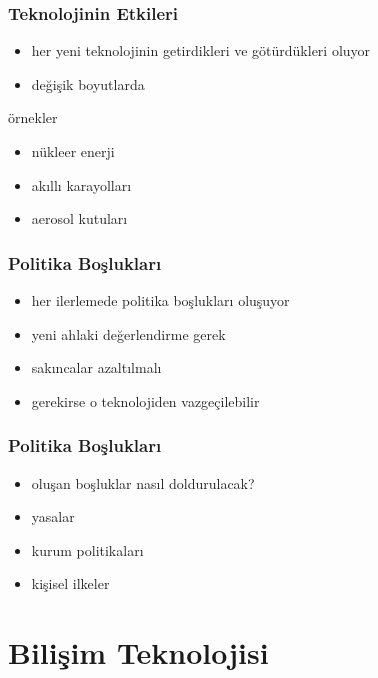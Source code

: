 \documentclass[dvipsnames]{beamer}
\theoremstyle{plain}
\begin{document}
\begin{frame}
  \frametitle{Teknolojinin Etkileri}

  \begin{itemize}
    \item her yeni teknolojinin getirdikleri ve götürdükleri oluyor
    \item değişik boyutlarda
  \end{itemize}

  \begin{exampleblock}{örnekler}
    \begin{itemize}
      \item nükleer enerji
      \item akıllı karayolları
      \item aerosol kutuları
    \end{itemize}
  \end{exampleblock}
\end{frame}

\begin{frame}
  \frametitle{Politika Boşlukları}

  \begin{itemize}
    \item her ilerlemede politika boşlukları oluşuyor

    \bigskip
    \item yeni ahlaki değerlendirme gerek
    \item sakıncalar azaltılmalı
    \item gerekirse o teknolojiden vazgeçilebilir
  \end{itemize}
\end{frame}

\begin{frame}
  \frametitle{Politika Boşlukları}

  \begin{itemize}
    \item oluşan boşluklar nasıl doldurulacak?

    \bigskip
    \item yasalar
    \item kurum politikaları
    \item kişisel ilkeler
  \end{itemize}
\end{frame}

\section{Bilişim Teknolojisi}
\end{document}
